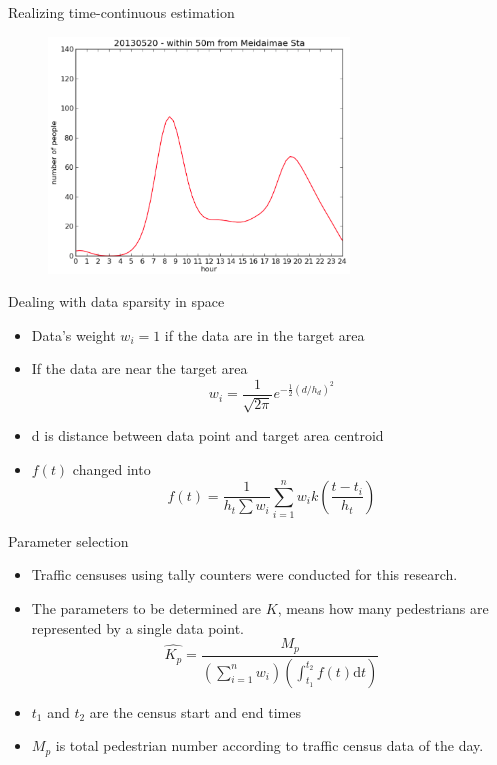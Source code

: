 \begin{frame}{Realizing time-continuous estimation}

\begin{figure}
\includegraphics[width = 8cm]{pic7.png}
\end{figure}

\end{frame}

\begin{frame}{Dealing with data sparsity in space}

\begin{itemize}
\itemsep1pt\parskip0pt
\item
  Data's weight \(w_i = 1\) if the data are in the target area
\item
  If the data are near the target area
  \[w_i = \frac{1}{ \sqrt{2\pi} }e^{-\frac{1}{2}(d/h_d)^2}\]
\item
  d is distance between data point and target area centroid
\item
  \(f(t)\) changed into
  \[f(t) = \frac{1}{h_t\sum w_i}\sum_{i=1}^{n}w_i k(\frac{t-t_i}{h_t})\]
\end{itemize}

\end{frame}

\begin{frame}{Parameter selection}

\begin{itemize}
\itemsep1pt\parskip0pt
\item
  Traffic censuses using tally counters were conducted for this
  research.
\item
  The parameters to be determined are \(K\), means how many pedestrians
  are represented by a single data point.
  \[\hat{K_p}=\frac{M_p}{(\sum_{i=1}^n w_i)(\int_{t_1}^{t_2}f(t)\mathrm{d}t)}\]
\item
  \(t_1\) and \(t_2\) are the census start and end times
\item
  \(M_p\) is total pedestrian number according to traffic census data of
  the day.
\end{itemize}

\end{frame}

